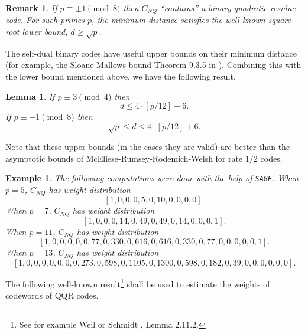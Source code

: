 \documentclass[submission%
]{dmtcs}
\newtheorem{lemma}{Lemma}
\newtheorem{example}{Example}
\newtheorem{remark}{Remark}
\def\fff{{\mathbb{F}}}
\def\sage{{\tt{SAGE}}}
\begin{document}
\begin{remark}
\label{remark:sqrt}
If $p\equiv \pm 1\pmod 8$ then $C_{NQ}$ ``contains'' 
a binary quadratic residue code. For such primes $p$, the 
minimum distance satisfies the well-known square-root
lower bound, $d\geq \sqrt{p}$.
\end{remark}



The self-dual binary codes have useful upper bounds on their 
minimum distance (for example, the Sloane-Mallows bound
Theorem 9.3.5 in \cite{HP}). 
Combining this with the lower bound mentioned above, we have
the following result.

\begin{lemma}
\label{lemma:mindist}
If $p\equiv 3 \pmod 4$ then 
\[
d\leq 4\cdot [p/12]+6.
\]
If $p\equiv -1 \pmod 8$ then 
\[
\sqrt{p}\leq 
d\leq 4\cdot [p/12]+6.
\]
\end{lemma}

Note that these upper bounds (in the cases they are valid) 
are better than the asymptotic bounds of 
McEliese-Rumsey-Rodemich-Welsh for rate $1/2$ codes.

\begin{example}
The following computations were done with the help of \sage .
When $p=5$, $C_{NQ}$ has weight distribution
\[
[1, 0, 0, 0, 5, 0, 10, 0, 0, 0, 0].
\]
When $p=7$, $C_{NQ}$ has weight distribution
\[
 [1, 0, 0, 0, 14, 0, 49, 0, 49, 0, 14, 0, 0, 0, 1].
\]
When $p=11$, $C_{NQ}$ has weight distribution
\[
 [1, 0, 0, 0, 0, 0, 77, 0, 330, 0, 616, 0, 616, 0, 330, 0, 77, 0, 0, 0, 0, 0, 1].
\]
When $p=13$, $C_{NQ}$ has weight distribution
\[
[1, 0, 0, 0, 0, 0, 0, 0, 273,
 0, 598, 0, 1105, 0, 1300, 0,
 598, 0, 182, 0, 39, 0, 0, 0, 0, 0, 0].
\]

\end{example}


The following well-known result\footnote{See for example Weil \cite{W} or
Schmidt \cite{Sc}, Lemma 2.11.2.} shall be used to estimate the
weights of codewords of QQR codes.
\end{document}
